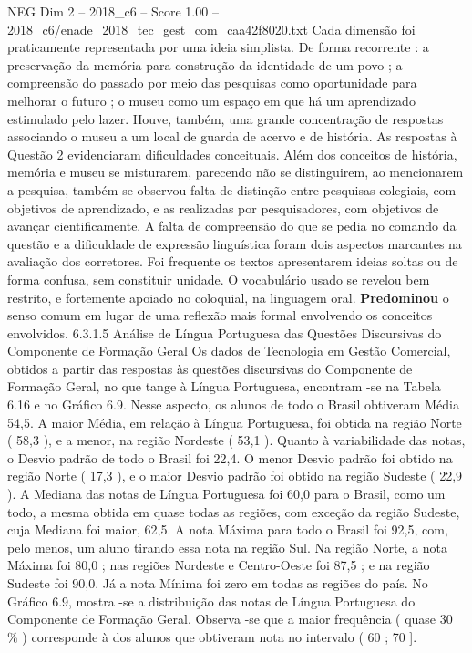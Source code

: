 \begin{textsample}{NEG Dim 2 – 2018\_c6 – Score 1.00 – 2018\_c6/enade\_2018\_tec\_gest\_com\_caa42f8020.txt}
Cada dimensão foi praticamente representada por uma ideia simplista.
De forma recorrente : a preservação da memória para construção da identidade de um povo ; a compreensão do passado por meio das pesquisas como oportunidade para melhorar o futuro ; o museu como um espaço em que há um aprendizado estimulado pelo lazer.
Houve, também, uma grande concentração de respostas associando o museu a um local de guarda de acervo e de história.
As respostas à Questão 2 evidenciaram dificuldades conceituais.
Além dos conceitos de história, memória e museu se misturarem, parecendo não se distinguirem, ao mencionarem a pesquisa, também se observou falta de distinção entre pesquisas colegiais, com objetivos de aprendizado, e as realizadas por pesquisadores, com objetivos de avançar cientificamente.
A falta de compreensão do que se pedia no comando da questão e a dificuldade de expressão linguística foram dois aspectos marcantes na avaliação dos corretores.
Foi frequente os textos apresentarem ideias soltas ou de forma confusa, sem constituir unidade.
O vocabulário usado se revelou bem restrito, e fortemente apoiado no coloquial, na linguagem oral. \textbf{Predominou} o senso comum em lugar de uma reflexão mais formal envolvendo os conceitos envolvidos. 6.3.1.5 Análise de Língua Portuguesa das Questões Discursivas do Componente de Formação Geral Os dados de Tecnologia em Gestão Comercial, obtidos a partir das respostas às questões discursivas do Componente de Formação Geral, no que tange à Língua Portuguesa, encontram -se na Tabela 6.16 e no Gráfico 6.9.
Nesse aspecto, os alunos de todo o Brasil obtiveram Média 54,5.
A maior Média, em relação à Língua Portuguesa, foi obtida na região Norte ( 58,3 ), e a menor, na região Nordeste ( 53,1 ).
Quanto à variabilidade das notas, o Desvio padrão de todo o Brasil foi 22,4.
O menor Desvio padrão foi obtido na região Norte ( 17,3 ), e o maior Desvio padrão foi obtido na região Sudeste ( 22,9 ).
A Mediana das notas de Língua Portuguesa foi 60,0 para o Brasil, como um todo, a mesma obtida em quase todas as regiões, com exceção da região Sudeste, cuja Mediana foi maior, 62,5.
A nota Máxima para todo o Brasil foi 92,5, com, pelo menos, um aluno tirando essa nota na região Sul.
Na região Norte, a nota Máxima foi 80,0 ; nas regiões Nordeste e Centro-Oeste foi 87,5 ; e na região Sudeste foi 90,0.
Já a nota Mínima foi zero em todas as regiões do país.
No Gráfico 6.9, mostra -se a distribuição das notas de Língua Portuguesa do Componente de Formação Geral.
Observa -se que a maior frequência ( quase 30 \% ) corresponde à dos alunos que obtiveram nota no intervalo ( 60 ; 70 ].

\end{textsample}
